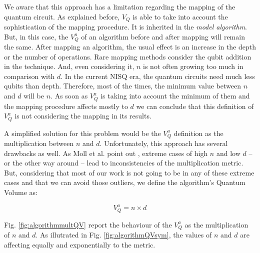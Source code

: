 \begin{itemize}
\begin{itemize}
\begin{itemize}
We aware that this approach has a limitation regarding the mapping of the quantum circuit.
As explained before, \(V_Q\) is able to take into account the sophistication of the mapping procedure.
It is inherited in the \emph{model algorithm}.
But, in this case, the \(V^a_Q\) of an algorithm before and after mapping will remain the same.
After mapping an algorithm, the usual effect is an increase in the depth or the number of operations.
Rare mapping methods consider the qubit addition in the technique.
And, even considering it, \(n\) is not often growing too much in comparison with \(d\).
In the current NISQ era, the quantum circuits need much less qubits than depth.
Therefore, most of the times, the minimum value between \(n\) and \(d\) will be \(n\).
As soon as \(V^a_Q\) is taking into account the minimum of them and the mapping procedure affects mostly to \(d\) we can conclude that this definition of \(V^a_Q\) is not considering the mapping in its results.

A simplified solution for this problem would be the \(V^a_Q\) definition as the multiplication between \(n\) and \(d\).
Unfortunately, this approach has several drawbacks as well.
As Moll et al. point out \cite{Moll_2018}, extreme cases of high \(n\) and low \(d\) -- or the other way around -- lead to inconsistencies of the multiplication metric.
But, considering that most of our work is not going to be in any of these extreme cases and that we can avoid those outliers, we define the algorithm's Quantum Volume as:

\begin{equation}
\label{eq:org85f5b32}
V_Q^a =  n \times d
\end{equation}

Fig. \ref{fig:algorithmmultQV} report the behaviour of the \(V_Q^a\) as
the multiplication of \(n\) and \(d\).
As illutrated in Fig. \ref{fig:algorithmQVsym}, the values of \(n\) and \(d\) are
affecting equally and exponentially to the metric.


\end{itemize}
\end{itemize}
\end{itemize}
